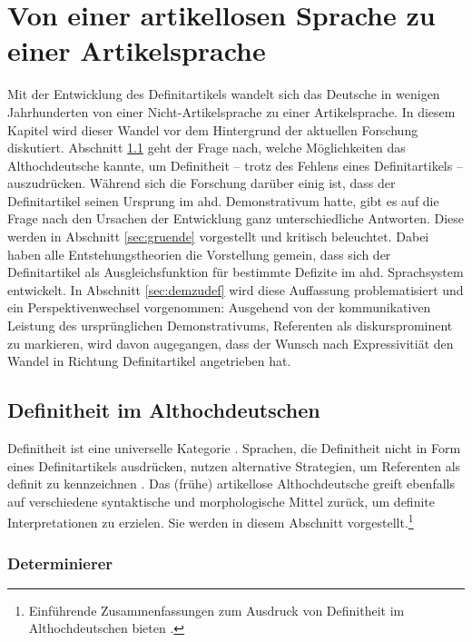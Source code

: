 \chapter{Von einer artikellosen Sprache zu einer Artikelsprache}\label{forschung}


Mit der Entwicklung des Definitartikels wandelt sich das Deutsche in wenigen Jahrhunderten von einer Nicht-Artikelsprache zu einer Artikelsprache. 
In diesem Kapitel wird dieser Wandel vor dem Hintergrund der aktuellen Forschung diskutiert. Abschnitt \ref{sec:def-ahd} geht der Frage nach, welche Möglichkeiten das Althochdeutsche kannte, um Definitheit -- trotz des Fehlens eines Definitartikels -- auszudrücken. Während sich die Forschung darüber einig ist, dass der Definitartikel seinen Ursprung im ahd. Demonstrativum  hatte,
gibt es auf die Frage nach den Ursachen der Entwicklung ganz unterschiedliche Antworten. Diese werden in Abschnitt \ref{sec:gruende} vorgestellt und kritisch beleuchtet. Dabei haben alle Entstehungstheorien die Vorstellung gemein, dass sich der Definitartikel als Ausgleichsfunktion für bestimmte Defizite im ahd. Sprachsystem entwickelt. In Abschnitt  \ref{sec:demzudef} wird diese Auffassung problematisiert und ein Perspektivenwechsel vorgenommen: Ausgehend von der kommunikativen Leistung des ursprünglichen Demonstrativums, Referenten als diskursprominent zu markieren, wird davon augegangen, dass der Wunsch nach Expressivitiät den Wandel in Richtung Definitartikel angetrieben hat.

\section{Definitheit im Althochdeutschen} \label{sec:def-ahd}

Definitheit ist eine universelle Kategorie \parencite[269]{Leiss2000}. Sprachen, die Definitheit nicht in Form eines Definitartikels ausdrücken, nutzen alternative Strategien, um Referenten als definit zu kennzeichnen \parencite[für einen typologischen Überblick s.][]{Kramsky1972}. Das (frühe) artikellose Althochdeutsche greift ebenfalls auf verschiedene syntaktische und morphologische Mittel zurück, um definite Interpretationen zu erzielen. Sie werden in diesem Abschnitt vorgestellt.\footnote{Einführende Zusammenfassungen zum Ausdruck von Definitheit im Althochdeutschen bieten \textcite{Szczepaniak2011a,Ferraresi2014,Szczepaniak2015}.}

\subsection{Determinierer}\label{determinierer}

